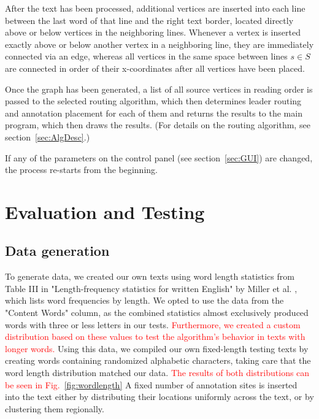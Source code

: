 \documentclass[11pt,a4paper]{vutinfth}
\newcommand{\change}[1]{\textcolor{red}{#1}}
\begin{document}
After the text has been processed, additional vertices are inserted into each line between the last word of that line and the right text border, located directly above or below vertices in the neighboring lines. Whenever a vertex is inserted exactly above or below another vertex in a neighboring line, they are immediately connected via an edge, whereas all vertices in the same space between lines $s \in S$ are connected in order of their x-coordinates after all vertices have been placed.

Once the graph has been generated, a list of all source vertices in reading order is passed to the selected routing algorithm, which then determines leader routing and annotation placement for each of them and returns the results to the main program, which then draws the results. (For details on the routing algorithm, see section~\ref*{sec:AlgDesc}.)

If any of the parameters on the control panel (see section~\ref*{sec:GUI}) are changed, the process re-starts from the beginning.



\chapter{Evaluation and Testing}

\section{Data generation} 

To generate data, we created our own texts using word length statistics from Table III in "Length-frequency statistics for written English" by Miller et al. \cite{Miller1958}, which lists word frequencies by length. We opted to use the data from the "Content Words" column, as the combined statistics almost exclusively produced words with three or less letters in our tests. \change{Furthermore, we created a custom distribution based on these values to test the algorithm's behavior in texts with longer words.}
Using this data, we compiled our own fixed-length testing texts by creating words containing randomized alphabetic characters, taking care that the word length distribution matched our data. \change{The results of both distributions can be seen in Fig.~\ref{fig:wordlength}}
A fixed number of annotation sites is inserted into the text either by distributing their locations uniformly across the text, or by clustering them regionally. 
	
\end{document}
